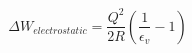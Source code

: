 \begin{equation}
{\Delta}W_{electrostatic} = \frac{Q^{2}}{2R} \left ( \frac{1}{\epsilon_{v}} - 1 \right )
\end{equation}
